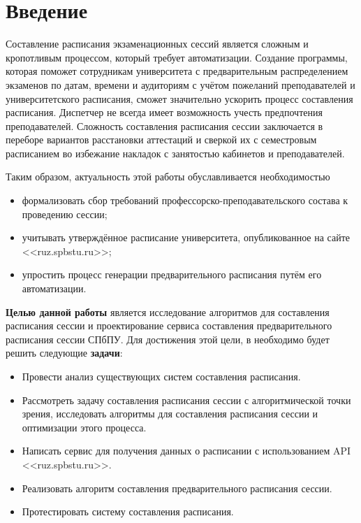   
\chapter*{Введение} %

Составление расписания экзаменационных сессий является сложным и кропотливым процессом, который требует автоматизации. Создание программы, которая поможет сотрудникам университета с предварительным распределением экзаменов по датам, времени и аудиториям с учётом пожеланий преподавателей и университетского расписания, сможет значительно ускорить процесс составления расписания. Диспетчер не всегда имеет возможность учесть предпочтения преподавателей.
Сложность составления расписания сессии заключается в переборе вариантов расстановки аттестаций и сверкой их с семестровым расписанием во избежание накладок с занятостью кабинетов и преподавателей. 

Таким образом, актуальность этой работы обуславливается необходимостью
\begin{itemize}
	\item формализовать сбор требований профессорско-преподавательского состава к проведению сессии;
	\item учитывать утверждённое расписание университета, опубликованное на сайте <<ruz.spbstu.ru>>;
	\item упростить процесс генерации предварительного расписания путём его автоматизации.
\end{itemize}

\textbf{Целью данной работы} является исследование алгоритмов для составления расписания сессии и проектирование сервиса составления предварительного расписания сессии СПбПУ.
Для достижения этой цели, в необходимо будет решить следующие \textbf{задачи}:

\begin{itemize}
	\item Провести анализ существующих систем составления расписания.
	\item Рассмотреть задачу составления расписания сессии с алгоритмической точки зрения, исследовать алгоритмы для составления расписания сессии и оптимизации этого процесса.
	\item Написать сервис для получения данных о расписании с использованием API <<ruz.spbstu.ru>>. %
	\item Реализовать алгоритм составления предварительного расписания сессии. 
	\item Протестировать систему составления расписания.
\end{itemize}